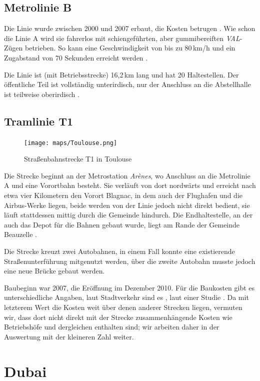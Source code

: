 \subsection*{Metrolinie B}

Die Linie wurde zwischen 2000 und 2007 erbaut, die Kosten betrugen .
Wie schon die Linie A wird sie fahrerlos mit schiengeführten, aber gummibereiften \textit{VAL}-Zügen betrieben. So kann eine Geschwindigkeit von bis zu 80\,km/h und ein Zugabstand von 70 Sekunden erreicht werden \cite{lafage}.

Die Linie ist (mit Betriebsstrecke) 16,2\,km lang und hat 20 Haltestellen. Der öffentliche Teil ist vollständig unterirdisch, nur der Anschluss an die Abstellhalle ist teilweise oberirdisch \cite{lafage}.

\subsection*{Tramlinie T1}

\begin{figure}
  \texttt{[image: maps/Toulouse.png]}
  \caption{Straßenbahnstrecke T1 in Toulouse}
\end{figure}

Die Strecke beginnt an der Metrostation \textit{Arènes}, wo Anschluss an die Metrolinie A und eine Vorortbahn besteht. Sie verläuft von dort nordwärts und erreicht nach etwa vier Kilometern den Vorort Blagnac, in dem auch der Flughafen und die Airbus-Werke liegen, beide werden von der Linie jedoch nicht direkt bedient, sie läuft stattdessen mittig durch die Gemeinde hindurch. Die Endhaltestelle, an der auch das Depot für die Bahnen gebaut wurde, liegt am Rande der Gemeinde Beauzelle \cite{lafage}.

Die Strecke kreuzt zwei Autobahnen, in einem Fall konnte eine existierende Straßenunterführung mitgenutzt werden, über die zweite Autobahn musste jedoch eine neue Brücke gebaut werden.


Baubeginn war 2007, die Eröffnung im Dezember 2010. Für die Baukosten gibt es unterschiedliche Angaben, laut Stadtverkehr \cite{tlsesv} sind es , laut einer Studie . Da mit letzterem Wert die Kosten weit über denen anderer Strecken liegen, vermuten wir, dass dort nicht direkt mit der Strecke zusammenhängende Kosten wie Betriebshöfe und dergleichen enthalten sind; wir arbeiten daher in der Auswertung mit der kleineren Zahl weiter.


\section{Dubai}

